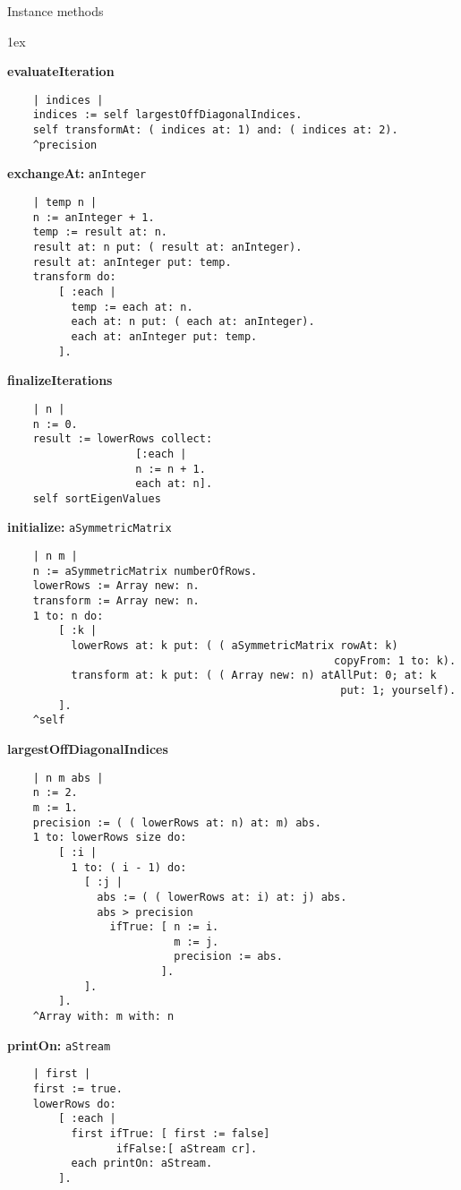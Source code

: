 Instance methods
{\parskip 1ex\par\noindent}
{\bf evaluateIteration}
\begin{verbatim}
    | indices |
    indices := self largestOffDiagonalIndices.
    self transformAt: ( indices at: 1) and: ( indices at: 2).
    ^precision

\end{verbatim}
{\bf exchangeAt:} {\tt anInteger}
\begin{verbatim}
    | temp n |
    n := anInteger + 1.
    temp := result at: n.
    result at: n put: ( result at: anInteger).
    result at: anInteger put: temp.
    transform do:
        [ :each |
          temp := each at: n.
          each at: n put: ( each at: anInteger).
          each at: anInteger put: temp.
        ].

\end{verbatim}
{\bf finalizeIterations}
\begin{verbatim}
    | n |
    n := 0.
    result := lowerRows collect: 
                    [:each | 
                    n := n + 1.
                    each at: n].
    self sortEigenValues

\end{verbatim}
{\bf initialize:} {\tt aSymmetricMatrix}
\begin{verbatim}
    | n m |
    n := aSymmetricMatrix numberOfRows.
    lowerRows := Array new: n.
    transform := Array new: n.
    1 to: n do:
        [ :k |
          lowerRows at: k put: ( ( aSymmetricMatrix rowAt: k) 
                                                   copyFrom: 1 to: k).
          transform at: k put: ( ( Array new: n) atAllPut: 0; at: k 
                                                    put: 1; yourself).
        ].
    ^self

\end{verbatim}
{\bf largestOffDiagonalIndices}
\begin{verbatim}
    | n m abs |
    n := 2.
    m := 1.
    precision := ( ( lowerRows at: n) at: m) abs.
    1 to: lowerRows size do:
        [ :i |
          1 to: ( i - 1) do:
            [ :j |
              abs := ( ( lowerRows at: i) at: j) abs.
              abs > precision
                ifTrue: [ n := i.
                          m := j.
                          precision := abs.
                        ]. 
            ].
        ].
    ^Array with: m with: n

\end{verbatim}
{\bf printOn:} {\tt aStream}
\begin{verbatim}
    | first |
    first := true.
    lowerRows do: 
        [ :each |
          first ifTrue: [ first := false]
                 ifFalse:[ aStream cr].
          each printOn: aStream.
        ].

\end{verbatim}
